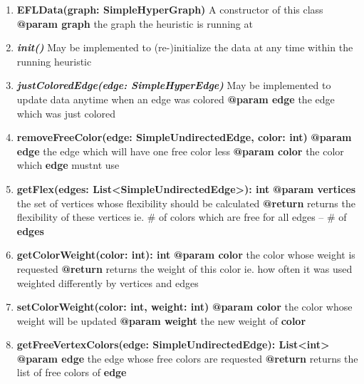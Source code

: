 \documentclass{article}
\begin{document}
	\begin{enumerate}[\#]
		\item{
			\textbf{EFLData(graph: SimpleHyperGraph)} \newline
			A constructor of this class \newline
			\textbf{@param graph} the graph the heuristic is running at
		}
		\item{
			\textbf{\textit{init()}} \newline
			May be implemented to (re-)initialize the data at any time within the running heuristic
		}
		\item{
			\textbf{\textit{justColoredEdge(edge: SimpleHyperEdge)}} \newline
			May be implemented to update data anytime when an edge was colored \newline
			\textbf{@param edge} the edge which was just colored
		}
		\item{
			\textbf{removeFreeColor(edge: SimpleUndirectedEdge, color: int)} \newline
			\textbf{@param edge} the edge which will have one free color less \newline
			\textbf{@param color} the color which \textbf{edge} mustnt use
		}
		\item{
			\textbf{getFlex(edges: List<SimpleUndirectedEdge>): int} \newline
			\textbf{@param vertices} the set of vertices whose flexibility should be calculated \newline
			\textbf{@return} returns the flexibility of these vertices ie. \# of colors which are free for all edges -- \# of \textbf{edges}
		}
		\item{
			\textbf{getColorWeight(color: int): int} \newline
			\textbf{@param color} the color whose weight is requested \newline
			\textbf{@return} returns the weight of this color ie. how often it was used weighted differently by vertices and edges
		}
		\item{
			\textbf{setColorWeight(color: int, weight: int)} \newline
			\textbf{@param color} the color whose weight will be updated \newline
			\textbf{@param weight} the new weight of \textbf{color}
		}
		\item{
			\textbf{getFreeVertexColors(edge: SimpleUndirectedEdge): List<int>} \newline
			\textbf{@param edge} the edge whose free colors are requested \newline
			\textbf{@return} returns the list of free colors of \textbf{edge}
		}
	\end{enumerate}
	
\end{document}
